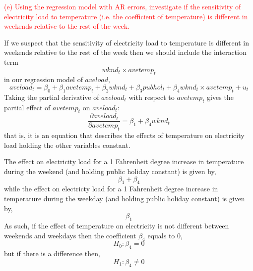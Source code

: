 \documentclass[12pt]{report}
\begin{document}
\newpage
\noindent \textcolor{red}
{
	(e) Using the regression model with AR errors, investigate if the sensitivity of electricity load to temperature (i.e. the coefficient of temperature) is different in weekends relative to the rest of the week.
}

\noindent If we suspect that the sensitivity of electricity load to temperature is different in weekends relative to the rest of the week then we should include the interaction term $$wknd_t\times avetemp_t$$ in our regression model of $aveload$, $$aveload_t = \beta_0 + \beta_1 avetemp_t + \beta_2wknd_t + \beta_3pubhol_t + \beta_4wknd_t\times avetemp_t + u_t$$ Taking the partial derivative of $aveload_t$ with respect to $avetemp_t$ gives the partial effect of $avetemp_t$ on $aveload_t$: $$\dfrac{\partial aveload_t}{\partial avetemp_t} = \beta_1 + \beta_4 wknd_t$$ that is, it is an equation that describes the effects of temperature on electricity load holding the other variables constant. 

\noindent The effect on electricity load for a 1 Fahrenheit degree increase in temperature during the weekend (and holding public holiday constant) is given by, $$\beta_1 + \beta_4$$ while the effect on electricty load for a 1 Fahrenheit degree increase in temperature during the weekday (and holding public holiday constant) is given by, $$\beta_1$$ As such, if the effect of temperature on electricity is not different between weekends and weekdays then the coefficient $\beta_4$ equals to 0, $$H_0: \beta_4 = 0$$ but if there is a difference then, $$H_1: \beta_4 \neq 0$$
\end{document}
